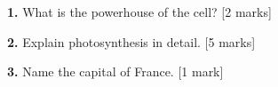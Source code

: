 \documentclass[12pt]{article}
\begin{document}
\noindent\textbf{1.} What is the powerhouse of the cell? \hfill [2 marks]
\vspace{40mm}

\noindent\textbf{2.} Explain photosynthesis in detail. \hfill [5 marks]
\vspace{85mm}

\noindent\textbf{3.} Name the capital of France. \hfill [1 mark]
\vspace{25mm}
\end{document}
